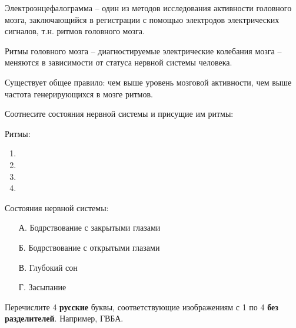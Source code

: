
Электроэнцефалограмма – один из методов исследования активности головного мозга, заключающийся в регистрации с помощью электродов электрических сигналов, т.н. ритмов головного мозга.

Ритмы головного мозга – диагностируемые электрические колебания мозга – меняются в зависимости от статуса нервной системы человека.

Существует общее правило: чем выше уровень мозговой активности, чем выше частота генерирующихся в мозге ритмов.

Соотнесите состояния нервной системы и присущие им ритмы:

Ритмы:

\begin{enumerate}
    \item 
    \item 
    \item 
    \item 
\end{enumerate}

Состояния нервной системы:
\begin{enumerate}
    \item[А.] Бодрствование с закрытыми глазами
    \item[Б.] Бодрствование с открытыми глазами
    \item[В.] Глубокий сон
    \item[Г.] Засыпание
\end{enumerate} 

Перечислите 4 \textbf{русские} буквы, соответствующие изображениям с 1 по 4 \textbf{без разделителей}. Например, ГВБА.

